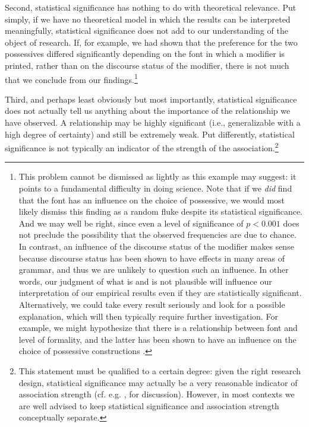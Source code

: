 Second, statistical significance  has nothing to do with theoretical relevance. Put simply, if we have no theoretical model in which the results can be interpreted meaningfully, statistical significance does not add to our understanding of the object of research. If, for example, we had shown that the preference for the two possessives  differed significantly depending on the font in which a modifier is printed, rather than on the discourse status of the modifier, there is not much that we conclude from our findings.\footnote{This problem cannot be dismissed as lightly as this example may suggest: it points to a fundamental difficulty in doing science. Note that if we \textit{did} find that the font has an influence on the choice of possessive,  we would most likely dismiss this finding as a random  fluke despite its statistical significance.  And we may well be right, since even a level of significance of $p < 0.001$ does not preclude the possibility that the observed frequencies  are due to chance.  In contrast, an influence of the discourse status of the modifier makes sense because discourse status has been shown to have effects in many areas of grammar,  and thus we are unlikely to question such an influence. In other words, our judgment of what is and is not plausible will influence our interpretation of our empirical results even if they are statistically significant. Alternatively, we could take every result seriously and look for a possible explanation,  which will then typically require further investigation. For example, we might hypothesize that there is a relationship between font and level of formality, and the latter has been shown to have an influence on the choice of possessive  constructions \citep{jucker_genitive_1993}.}

Third, and perhaps least obviously but most importantly, statistical significance  does not actually tell us anything about the importance of the relationship we have observed. A relationship may be highly significant (i.e., generalizable with a high degree of certainty) and still be extremely weak. Put differently, statistical significance is not typically an indicator of the strength of the  association.\footnote{This statement must be qualified to a certain degree: given the right research design,  statistical significance  may actually be a very reasonable indicator of association  strength (cf. e.g. \citealt{stefanowitsch_collostructions:_2003}, \citealt{gries_extending_2004} for discussion). However, in most contexts we are well advised to keep statistical significance and association strength conceptually separate.}


